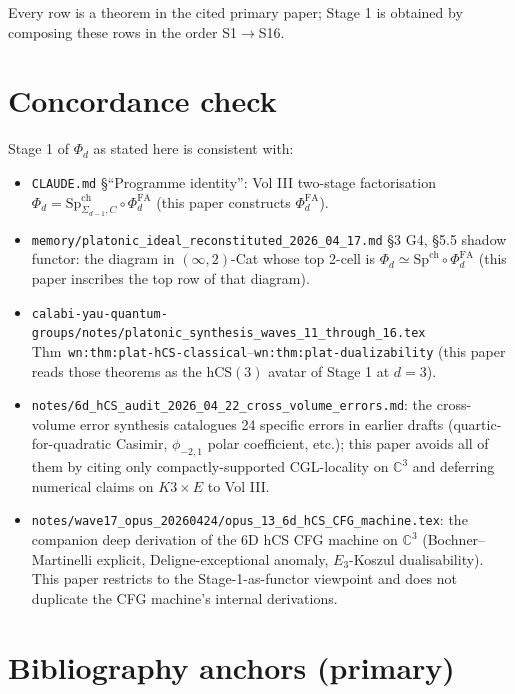 \documentclass[11pt]{article}
\theoremstyle{definition}
\providecommand{\CC}{\mathbb{C}}
\providecommand{\hCS}{\mathrm{hCS}}
\providecommand{\FA}{\mathrm{FA}}
\begin{document}
Every row is a theorem in the cited primary paper; Stage 1 is
obtained by composing these rows in the order S1$\to$S16.

\section*{Concordance check}

Stage 1 of $\Phi_d$ as stated here is consistent with:
\begin{itemize}[leftmargin=2em]
  \item \texttt{CLAUDE.md} \S ``Programme identity'': Vol III
        two-stage factorisation
        $\Phi_d = \mathrm{Sp}^{\mathrm{ch}}_{\Sigma_{d-1},C}
        \circ \Phi^{\FA}_d$ (this paper constructs $\Phi^{\FA}_d$).
  \item \texttt{memory/platonic\_ideal\_reconstituted\_2026\_04\_17.md}
        \S3 G4, \S5.5 shadow functor: the diagram in
        $(\infty,2)$-Cat whose top 2-cell is
        $\Phi_d \simeq \mathrm{Sp}^{\mathrm{ch}}\circ\Phi^{\FA}_d$
        (this paper inscribes the top row of that diagram).
  \item \texttt{calabi-yau-quantum-groups/notes/platonic\_synthesis\_waves\_11\_through\_16.tex}
        Thm~\texttt{wn:thm:plat-hCS-classical}--\texttt{wn:thm:plat-dualizability}
        (this paper reads those theorems as the $\hCS(3)$ avatar of
        Stage 1 at $d = 3$).
  \item \texttt{notes/6d\_hCS\_audit\_2026\_04\_22\_cross\_volume\_errors.md}:
        the cross-volume error synthesis catalogues 24 specific errors
        in earlier drafts (quartic-for-quadratic Casimir, $\phi_{-2,1}$
        polar coefficient, etc.); this paper avoids all of them by
        citing only compactly-supported CGL-locality on $\CC^3$ and
        deferring numerical claims on $K3\times E$ to Vol III.
  \item \texttt{notes/wave17\_opus\_20260424/opus\_13\_6d\_hCS\_CFG\_machine.tex}:
        the companion deep derivation of the 6D hCS CFG machine on
        $\CC^3$ (Bochner--Martinelli explicit, Deligne-exceptional
        anomaly, $E_3$-Koszul dualisability). This paper restricts to
        the Stage-1-as-functor viewpoint and does not duplicate the
        CFG machine's internal derivations.
\end{itemize}

\section*{Bibliography anchors (primary)}
\end{document}
